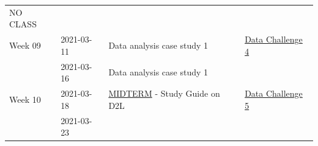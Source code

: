 \documentclass[
]{book}
\begin{document}
\begin{longtable}[]{@{}llll@{}}
\begin{minipage}[t]{0.22\columnwidth}
NO CLASS\strut
\end{minipage}\tabularnewline
\begin{minipage}[t]{0.22\columnwidth}\raggedright
Week 09\strut
\end{minipage} & \begin{minipage}[t]{0.22\columnwidth}\raggedright
2021-03-11\strut
\end{minipage} & \begin{minipage}[t]{0.22\columnwidth}\raggedright
Data analysis case study 1\strut
\end{minipage} & \begin{minipage}[t]{0.22\columnwidth}\raggedright
\href{https://classroom.github.com/a/7LkbbJyL}{Data Challenge 4}\strut
\end{minipage}\tabularnewline
\begin{minipage}[t]{0.22\columnwidth}\raggedright
\strut
\end{minipage} & \begin{minipage}[t]{0.22\columnwidth}\raggedright
2021-03-16\strut
\end{minipage} & \begin{minipage}[t]{0.22\columnwidth}\raggedright
Data analysis case study 1\strut
\end{minipage} & \begin{minipage}[t]{0.22\columnwidth}\raggedright
\strut
\end{minipage}\tabularnewline
\begin{minipage}[t]{0.22\columnwidth}\raggedright
Week 10\strut
\end{minipage} & \begin{minipage}[t]{0.22\columnwidth}\raggedright
2021-03-18\strut
\end{minipage} & \begin{minipage}[t]{0.22\columnwidth}\raggedright
\href{}{MIDTERM} - Study Guide on D2L\strut
\end{minipage} & \begin{minipage}[t]{0.22\columnwidth}\raggedright
\href{https://classroom.github.com/a/lxjBRX4h}{Data Challenge 5}\strut
\end{minipage}\tabularnewline
\begin{minipage}[t]{0.22\columnwidth}\raggedright
\strut
\end{minipage} & \begin{minipage}[t]{0.22\columnwidth}\raggedright
2021-03-23\strut
\end{minipage} & \begin{minipage}[t]{0.22\columnwidth}\raggedright

\end{minipage}
\end{longtable}
\end{document}
